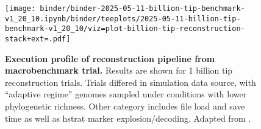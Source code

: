 \begin{figure}[h]
\centering
\begin{minipage}{0.5\linewidth}
\texttt{[image: binder/binder-2025-05-11-billion-tip-benchmark-v1\_20\_10.ipynb/binder/teeplots/2025-05-11-billion-tip-benchmark-v1\_20\_10/viz=plot-billion-tip-reconstruction-stack+ext=.pdf]}
\end{minipage}%
\begin{minipage}{0.5\linewidth}
\caption{%
\textbf{Execution profile of reconstruction pipeline from macrobenchmark trial.}
\small
Results are shown for 1 billion tip reconstruction trials.
Trials differed in simulation data source, with ``adaptive regime'' genomes sampled under conditions with lower phylogenetic richness.
Other category includes file load and save time as well as hstrat marker explosion/decoding.
Adapted from \citet{singhvi2025scalable}.
}
\label{fig:billion-tip-time}
\end{minipage}
\end{figure}
